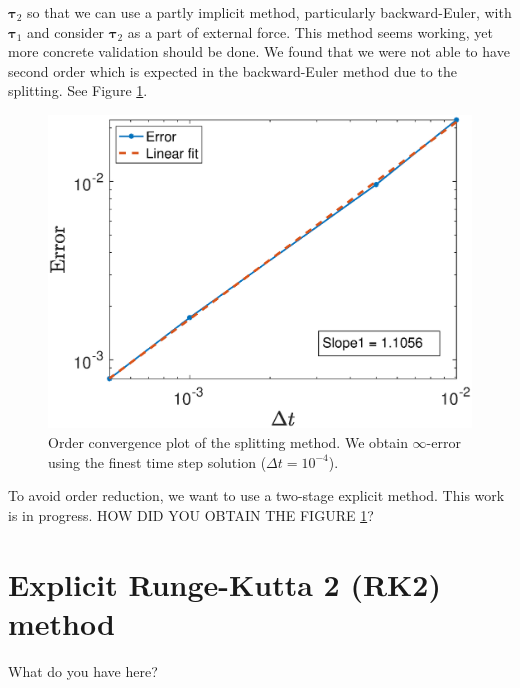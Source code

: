${\bm \tau_2}$ so that we can use a partly implicit method, particularly backward-Euler, with ${\bm \tau_1}$ and consider ${\bm \tau_2}$ as a part of external force. This method seems working, yet more concrete validation should be done. We found that we were not able to have second order which is expected in the backward-Euler method due to the splitting. See Figure \ref{fig_infError_vel}.
\begin{figure}[ht]
	\begin{center}
	
		\includegraphics[scale=0.5]{figures/fig_infError_vel.eps}
		\caption{Order convergence plot of the splitting method. We obtain $\infty$-error using the finest time step solution ($\Delta t = 10^{-4}$).}
	\label{fig_infError_vel}
	\end{center}
\end{figure}
To avoid order reduction, we want to use a two-stage explicit method. This work is in progress.
{\color{red} HOW DID YOU OBTAIN THE FIGURE \ref{fig_infError_vel}?}
\section{Explicit Runge-Kutta 2 (RK2) method}
What do you have here?
